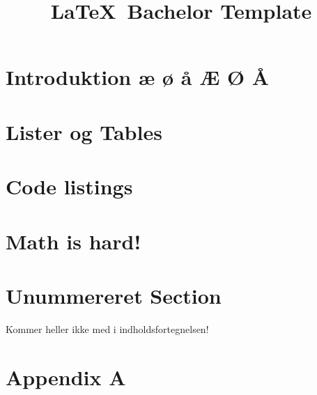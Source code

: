 \documentclass[10pt,oneside,a4paper,danish]{article}
\title{\LaTeX\ Bachelor Template}
\begin{document}


\newpage
\todototoc


\newpage
\tableofcontents
\thispagestyle{fancy} 

\newpage
{} 

\newpage
\section{Introduktion æ ø å Æ Ø Å} \label{ch1}
 

\newpage
\section{Lister og Tables} \label{ch2}


\newpage
\section{Code listings} \label{ch3}


\newpage
\section{Math is hard!} \label{ch4}


\newpage
\section*{Unummereret Section}
Kommer heller ikke med i indholdsfortegnelsen! 

%  

\label{EndOfText}

\newpage
{} 

\newpage
\listoffigures
\thispagestyle{fancy}

\newpage
{}
\listoftables
\thispagestyle{fancy}

\newpage
{}
 


\newpage
\section{Appendix A} \label{ch6}

\label{endOfDoc}
\end{document}
